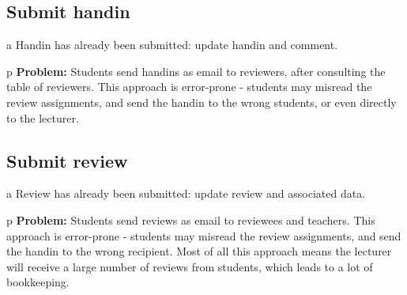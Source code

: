 \documentclass[Main]{subfiles}
\begin{document}
\subsection{Submit handin}\label{sec:SubmitHandin}

\begin{DataIntro}
\end{DataIntro}

\begin{TaskTable}

\RecordAddi
{a}
{Handin has already been submitted: update handin and comment.}{}


\RecordAddi
{p}
{\textbf{Problem:} Students send handins as email to reviewers, after consulting the table of reviewers. This approach is error-prone - students may misread the review assignments, and send the handin to the wrong students, or even directly to the lecturer.}{}


\end{TaskTable}




\newpage
\subsection{Submit review}\label{sec:SubmitReview}

\begin{DataIntro}
\end{DataIntro}

\begin{TaskTable}


\RecordAddi
{a}
{Review has already been submitted: update review and associated data.}{}


\RecordAddi
{p}
{\textbf{Problem:} Students send reviews as email to reviewees and teachers. This approach is error-prone - students may misread the review assignments, and send the handin to the wrong recipient. Most of all this approach means the lecturer will receive a large number of reviews from students, which leads to a lot of bookkeeping.}{}{}
\end{TaskTable}
\end{document}
